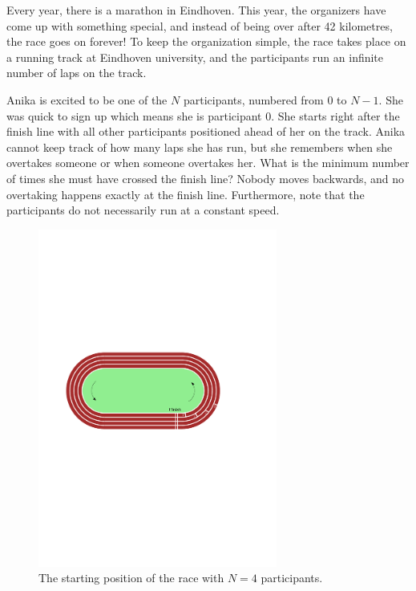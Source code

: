 
Every year, there is a marathon in Eindhoven. This year, the organizers have come up with something special, and instead of being over after 42 kilometres, the race goes on forever!
To keep the organization simple, the race takes place on a running track at Eindhoven university, and the participants run an infinite number of laps on the track.

Anika is excited to be one of the $N$ participants, numbered from $0$ to $N-1$. She was quick to sign up which means she is participant $0$. She starts right after the finish line with all other participants positioned ahead of her on the track. Anika cannot keep track of how many laps she has run, but she remembers when she overtakes someone or when someone overtakes her. What is the minimum number of times she must have crossed the finish line? Nobody moves backwards, and no overtaking happens exactly at the finish line. Furthermore, note that the participants do not necessarily run at a constant speed.

\begin{figure}[h]
    \center
    \includegraphics[width=0.7\textwidth]{track}
    \caption{The starting position of the race with $N = 4$ participants.}
\end{figure}

